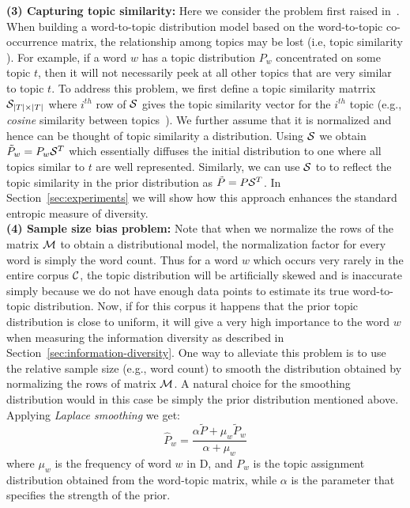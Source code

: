 \documentclass{article} %
\begin{document}
{\bf (3) Capturing topic similarity:} Here we consider the problem first raised in~\cite{bache:2013}. When building a word-to-topic distribution model based on 
the word-to-topic co-occurrence matrix, the relationship among topics may be lost (i.e, topic similarity ).  For example, if a word $w$
has a topic distribution $P_w$ concentrated on some topic $t$, then it will
not necessarily peek at all other topics that are very similar to topic $t$. To address this problem, we first define a topic similarity matrrix ${\mathcal S}_{|T|\times|T|}$
where $i^{th}$ row of ${\mathcal S}$ gives the topic similarity vector for the $i^{th}$ topic (e.g., {\em cosine} similarity between topics~\cite{bache:2013}). We further assume that it is normalized 
and hence can be thought of topic similarity a distribution. Using ${\mathcal S}$ we obtain $\tilde{P}_w = P_w{\mathcal S}^T$ which essentially diffuses the initial distribution to
one where  all topics similar to $t$ are well represented. Similarly, we can use ${\mathcal S}$ to to reflect the topic similarity in the prior distribution as $\tilde{P} = P{\mathcal S}^T$.
In Section~\ref{sec:experiments} we will show how this
approach enhances the standard entropic measure of diversity.\\
{\bf (4) Sample size bias problem:}  Note that 
when we normalize the rows of the matrix ${\mathcal M}$ to obtain a distributional model, the normalization factor 
for every word is simply the word count. Thus for a word $w$ which occurs very rarely
in the entire corpus ${\mathcal C}$, the topic distribution will be artificially skewed and is inaccurate simply because we do not have enough data points to estimate its true word-to-topic distribution.
Now, if for this corpus it happens that the prior topic distribution
is close to uniform, it will give a very high importance to the word
$w$ when measuring the information diversity as described in
Section~\ref{sec:information-diversity}.
One way to alleviate this
problem is to use the relative sample size (e.g., word count) to
smooth the distribution obtained by normalizing the rows of matrix
${\mathcal M}$. A natural choice for the smoothing distribution would in this
case be simply the prior distribution mentioned above. Applying {\em Laplace smoothing}
we get:
\begin{equation}
\widehat{P}_w=\frac{\alpha \tilde{P}+ \mu_w \tilde{P}_w}{\alpha+\mu_w}
\end{equation}
where $\mu_w$ is the frequency of word $w$ in D, and $P_w$ is the
topic assignment distribution obtained from the word-topic matrix,
while $\alpha$ is the parameter that specifies the strength of the
prior.
\end{document}
